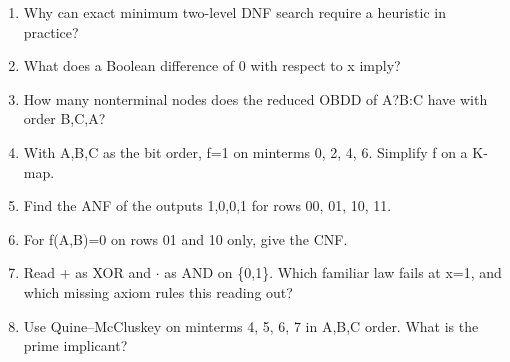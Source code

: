 \documentclass[11pt]{article}
\begin{document}
\begin{keepsection}
\begin{enumerate}
\item Why can exact minimum two-level DNF search require a heuristic in practice?
\item What does a Boolean difference of 0 with respect to x imply?
\item How many nonterminal nodes does the reduced OBDD of A?B:C have with order B,C,A?
\item With A,B,C as the bit order, f=1 on minterms 0, 2, 4, 6. Simplify f on a K-map.
\item Find the ANF of the outputs 1,0,0,1 for rows 00, 01, 10, 11.
\item For f(A,B)=0 on rows 01 and 10 only, give the CNF.
\item Read + as XOR and \ensuremath{\cdot} as AND on \{0,1\}. Which familiar law fails at x=1, and which missing axiom rules this reading out?
\item Use Quine–McCluskey on minterms 4, 5, 6, 7 in A,B,C order. What is the prime implicant?
\end{enumerate}

\end{keepsection}
\end{document}
